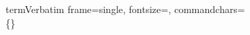 \newcommand{\tsuccess}{\textcolor{Green}}
\newcommand{\terror}{\textcolor{orange}}
\newcommand{\tfailure}{\textcolor{red}}
\newcommand{\tblack}{\textcolor{black}}

\DefineVerbatimEnvironment%
    {term}{Verbatim}
    {frame=single, fontsize=\footnotesize, commandchars=\\\{\}}

